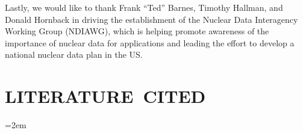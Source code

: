 \documentclass[letterpaper]{ar-1col}
\begin{document}
Lastly, we would like to thank Frank \enquote{Ted} Barnes, Timothy Hallman, and Donald Hornback in driving the establishment of the Nuclear Data Interagency Working Group (NDIAWG), which is helping promote awareness of the importance of nuclear data for applications and leading the effort to develop a national nuclear data plan in the US.

%
\section*{LITERATURE\ CITED}

\emergencystretch=2em









 

\end{document}
